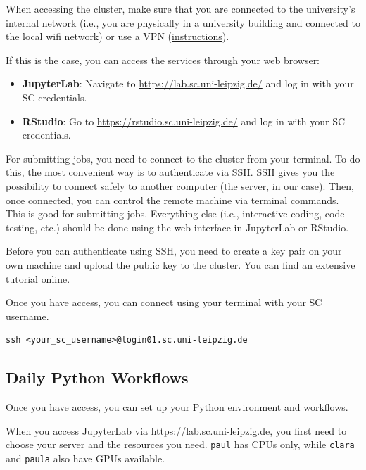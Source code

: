 \documentclass[
  letterpaper,
  DIV=11,
  numbers=noendperiod]{scrartcl}
\providecommand{\tightlist}{%
  \setlength{\itemsep}{0pt}\setlength{\parskip}{0pt}}\usepackage{longtable,booktabs,array}
\begin{document}
When accessing the cluster, make sure that you are connected to the
university's internal network (i.e., you are physically in a university
building and connected to the local wifi network) or use a VPN
(\href{https://www.urz.uni-leipzig.de/en/servicedesk-und-hilfe/hilfe-zu-unseren-services/netz-und-zugang/hilfe-vpn-zugang-zum-uni-netz-vpn-webvpn}{instructions}).

If this is the case, you can access the services through your web
browser:

\begin{itemize}
\tightlist
\item
  \textbf{JupyterLab}: Navigate to \url{https://lab.sc.uni-leipzig.de/}
  and log in with your SC credentials.
\item
  \textbf{RStudio}: Go to \url{https://rstudio.sc.uni-leipzig.de/} and
  log in with your SC credentials.
\end{itemize}

For submitting jobs, you need to connect to the cluster from your
terminal. To do this, the most convenient way is to authenticate via
SSH. SSH gives you the possibility to connect safely to another computer
(the server, in our case). Then, once connected, you can control the
remote machine via terminal commands. This is good for submitting jobs.
Everything else (i.e., interactive coding, code testing, etc.) should be
done using the web interface in JupyterLab or RStudio.

Before you can authenticate using SSH, you need to create a key pair on
your own machine and upload the public key to the cluster. You can find
an extensive tutorial
\href{https://www.sc.uni-leipzig.de/03_System_access/Cluster/}{online}.

Once you have access, you can connect using your terminal with your SC
username.

\begin{verbatim}
ssh <your_sc_username>@login01.sc.uni-leipzig.de
\end{verbatim}

\subsection{Daily Python Workflows}\label{daily-python-workflows}

Once you have access, you can set up your Python environment and
workflows.

When you access JupyterLab via https://lab.sc.uni-leipzig.de, you first
need to choose your server and the resources you need. \texttt{paul} has
CPUs only, while \texttt{clara} and \texttt{paula} also have GPUs
available.
\end{document}
